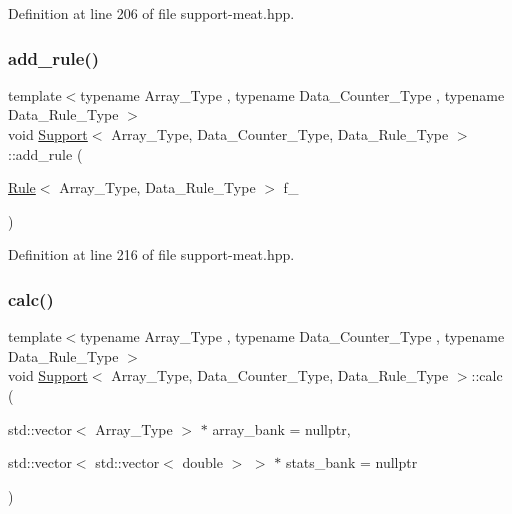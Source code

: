 Definition at line 206 of file support-\/meat.\+hpp.

\mbox{\label{class_support_aa817cb5d6c48dda3ecfeef2c5897b537}} 
\subsubsection{\texorpdfstring{add\+\_\+rule()}{add\_rule()}\hspace{0.1cm}{\footnotesize\ttfamily [2/2]}}
{\footnotesize\ttfamily template$<$typename Array\+\_\+\+Type , typename Data\+\_\+\+Counter\+\_\+\+Type , typename Data\+\_\+\+Rule\+\_\+\+Type $>$ \\
void \hyperlink{class_support}{Support}$<$ Array\+\_\+\+Type, Data\+\_\+\+Counter\+\_\+\+Type, Data\+\_\+\+Rule\+\_\+\+Type $>$\+::add\+\_\+rule (\begin{DoxyParamCaption}\item[{\hyperlink{class_rule}{Rule}$<$ Array\+\_\+\+Type, Data\+\_\+\+Rule\+\_\+\+Type $>$}]{f\+\_\+ }\end{DoxyParamCaption})\hspace{0.3cm}{\ttfamily [inline]}}



Definition at line 216 of file support-\/meat.\+hpp.

\mbox{\label{class_support_afa36b8c1348e28c51296379157f58081}} 
\subsubsection{\texorpdfstring{calc()}{calc()}}
{\footnotesize\ttfamily template$<$typename Array\+\_\+\+Type , typename Data\+\_\+\+Counter\+\_\+\+Type , typename Data\+\_\+\+Rule\+\_\+\+Type $>$ \\
void \hyperlink{class_support}{Support}$<$ Array\+\_\+\+Type, Data\+\_\+\+Counter\+\_\+\+Type, Data\+\_\+\+Rule\+\_\+\+Type $>$\+::calc (\begin{DoxyParamCaption}\item[{std\+::vector$<$ Array\+\_\+\+Type $>$ $\ast$}]{array\+\_\+bank = {\ttfamily nullptr},  }\item[{std\+::vector$<$ std\+::vector$<$ double $>$ $>$ $\ast$}]{stats\+\_\+bank = {\ttfamily nullptr} }\end{DoxyParamCaption})\hspace{0.3cm}{\ttfamily [inline]}}



